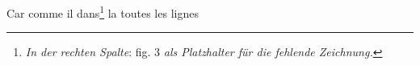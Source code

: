                     \pend 
                     \pstart  Car comme il  dans\footnote{\textit{In der rechten Spalte}: fig. 3 \textit{als Platzhalter für die fehlende Zeichnung.}} la \textsuperscript{}  toutes les lignes
